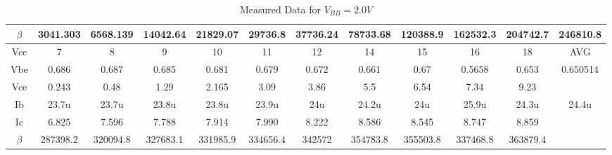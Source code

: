 \begin{table}[H]
{\begin{tabular}{cccccccccccc|}
                \multicolumn{1}{|c|}{$\beta$} & \multicolumn{1}{c|}{3041.303} & \multicolumn{1}{c|}{6568.139} & \multicolumn{1}{c|}{14042.64} & \multicolumn{1}{c|}{21829.07} & \multicolumn{1}{c|}{29736.8}  & \multicolumn{1}{c|}{37736.24} & \multicolumn{1}{c|}{78733.68} & \multicolumn{1}{c|}{120388.9} & \multicolumn{1}{c|}{162532.3} & \multicolumn{1}{c|}{204742.7} & 246810.8 \\ 
                \hline
                \hline
                \multicolumn{1}{|c|}{Vcc}     & \multicolumn{1}{c|}{7}        & \multicolumn{1}{c|}{8}        & \multicolumn{1}{c|}{9}        & \multicolumn{1}{c|}{10}       & \multicolumn{1}{c|}{11}       & \multicolumn{1}{c|}{12}       & \multicolumn{1}{c|}{14}       & \multicolumn{1}{c|}{15}       & \multicolumn{1}{c|}{16}       & \multicolumn{1}{c|}{18}       & AVG      \\ 
                \multicolumn{1}{|c|}{Vbe}     & \multicolumn{1}{c|}{0.686}    & \multicolumn{1}{c|}{0.687}    & \multicolumn{1}{c|}{0.685}    & \multicolumn{1}{c|}{0.681}    & \multicolumn{1}{c|}{0.679}    & \multicolumn{1}{c|}{0.672}    & \multicolumn{1}{c|}{0.661}    & \multicolumn{1}{c|}{0.67}     & \multicolumn{1}{c|}{0.5658}   & \multicolumn{1}{c|}{0.653}    & 0.650514 \\ 
                \multicolumn{1}{|c|}{Vce}     & \multicolumn{1}{c|}{0.243}    & \multicolumn{1}{c|}{0.48}     & \multicolumn{1}{c|}{1.29}     & \multicolumn{1}{c|}{2.165}    & \multicolumn{1}{c|}{3.09}     & \multicolumn{1}{c|}{3.86}     & \multicolumn{1}{c|}{5.5}      & \multicolumn{1}{c|}{6.54}     & \multicolumn{1}{c|}{7.34}     & \multicolumn{1}{c|}{9.23}     &          \\ 
                \multicolumn{1}{|c|}{Ib}      & \multicolumn{1}{c|}{23.7u}    & \multicolumn{1}{c|}{23.7u}    & \multicolumn{1}{c|}{23.8u}    & \multicolumn{1}{c|}{23.8u}    & \multicolumn{1}{c|}{23.9u}    & \multicolumn{1}{c|}{24u}      & \multicolumn{1}{c|}{24.2u}    & \multicolumn{1}{c|}{24u}      & \multicolumn{1}{c|}{25.9u}    & \multicolumn{1}{c|}{24.3u}    & 24.4u    \\ 
                \multicolumn{1}{|c|}{Ic}      & \multicolumn{1}{c|}{6.825}    & \multicolumn{1}{c|}{7.596}    & \multicolumn{1}{c|}{7.788}    & \multicolumn{1}{c|}{7.914}    & \multicolumn{1}{c|}{7.990}    & \multicolumn{1}{c|}{8.222}    & \multicolumn{1}{c|}{8.586}    & \multicolumn{1}{c|}{8.545}    & \multicolumn{1}{c|}{8.747}    & \multicolumn{1}{c|}{8.859}    &          \\ 
                \multicolumn{1}{|c|}{$\beta$} & \multicolumn{1}{c|}{287398.2} & \multicolumn{1}{c|}{320094.8} & \multicolumn{1}{c|}{327683.1} & \multicolumn{1}{c|}{331985.9} & \multicolumn{1}{c|}{334656.4} & \multicolumn{1}{c|}{342572}   & \multicolumn{1}{c|}{354783.8} & \multicolumn{1}{c|}{355503.8} & \multicolumn{1}{c|}{337468.8} & \multicolumn{1}{c|}{363879.4} &          \\ 
                \hline
                \end{tabular}
                }
                \caption{Measured Data for $V_{BB}=2.0V$}
                \end{table}\par

